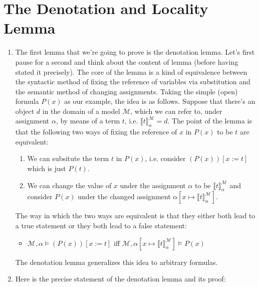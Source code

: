 	
\section{The Denotation and Locality Lemma}

	\begin{enumerate}[\thesection.1]

        \item The first lemma that we're going to prove is the
          denotation lemma. Let's first pause for a second and think
          about the content of lemma (before having stated it
          precisely). The core of the lemma is a kind of equivalence
          between the syntactic method of fixing the reference of
          variables via substitution and the semantic method of
          changing assignments. Taking the simple (open) formula
          $P(x)$ as our example, the idea is as follows. Suppose that
          there's an object $d$ in the domain of a model $\mathcal{M}$, which we can
          refer to, under assignment $\alpha$,  by means of a term
          $t$, i.e. $\llbracket t\rrbracket^\mathcal{M}_\alpha=d$. The
          point of the lemma is that the following two ways of fixing
          the reference of $x$ in $P(x)$ to be $t$  are equivalent:
          \begin{enumerate}[1.]
          \item We can subsitute the term $t$ in $P(x)$, i.e. consider
            $(P(x))[x:=t]$ which is just $P(t)$.
            \item We can change the value of $x$ under the assignment
              $\alpha$ to be $\llbracket
              t\rrbracket^\mathcal{M}_\alpha$ and consider $P(x)$
              under the changed assignment $\alpha[x\mapsto \llbracket
              t\rrbracket^\mathcal{M}_\alpha]$.
            \end{enumerate}
            The way in which the two ways are equivalent is that they
            either both lead to a true statement or they both lead to
            a false statement:
            \begin{itemize}
            \item $\mathcal{M},\alpha\vDash (P(x))[x:=t]$ iff
              $\mathcal{M},\alpha[x\mapsto \llbracket
              t\rrbracket^\mathcal{M}_\alpha]\vDash P(x)$
            \end{itemize}
          The denotation lemma generalizes this idea to arbitrary
          formulas.

          \item Here is the precise statement of the denotation lemma
            and its proof:
          

\end{enumerate}
